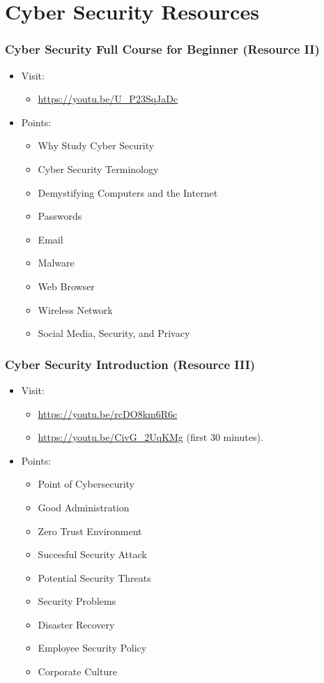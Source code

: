 \documentclass[aspectratio=169, xcolor=table, notheorems, hyperref={pdfpagelabels=false}]{beamer}
\begin{document}
\section{Cyber Security Resources}
\begin{frame}[fragile]
\frametitle{Cyber Security Full Course for Beginner (Resource II)}

\begin{itemize}
\item Visit:
\begin{itemize}
\item \url{https://youtu.be/U_P23SqJaDc}
\end{itemize}
\item Points:
\begin{itemize}
\item Why Study Cyber Security
\item Cyber Security Terminology
\item Demystifying Computers and the Internet
\item Passwords
\item Email
\item Malware
\item Web Browser
\item Wireless Network
\item Social Media, Security, and Privacy
\end{itemize}
\end{itemize}
\end{frame}


\begin{frame}[fragile]
\frametitle{Cyber Security Introduction (Resource III)}

\begin{itemize}
\item Visit:
\begin{itemize}
\item \url{https://youtu.be/rcDO8km6R6c}
\item \url{https://youtu.be/CivG_2UqKMg} (first 30 minutes).
\end{itemize}
\item Points:
\begin{itemize}
\item Point of Cybersecurity
\item Good Administration
\item Zero Trust Environment
\item Succesful Security Attack
\item Potential Security Threats
\item Security Problems
\item Disaster Recovery
\item Employee Security Policy
\item Corporate Culture
\end{itemize}
\end{itemize}
\end{frame}
\end{document}

